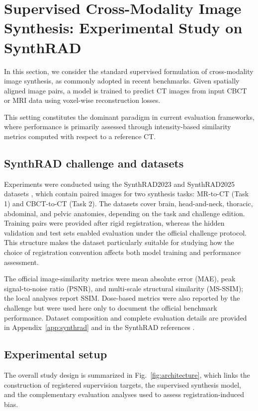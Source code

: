 \documentclass[lettersize,journal]{IEEEtran}
\begin{document}
\section{Supervised Cross-Modality Image Synthesis: Experimental Study on SynthRAD}

In this section, we consider the standard supervised formulation of cross-modality image synthesis, as commonly adopted in recent benchmarks. Given spatially aligned image pairs, a model is trained to predict CT images from input CBCT or MRI data using voxel-wise reconstruction losses.

This setting constitutes the dominant paradigm in current evaluation frameworks, where performance is primarily assessed through intensity-based similarity metrics computed with respect to a reference CT.

\subsection{SynthRAD challenge and datasets}

Experiments were conducted using the SynthRAD2023 and SynthRAD2025 datasets \cite{thummerer2025synthrad2025,huijben2024generating}, which contain paired images for two synthesis tasks: MR-to-CT (Task 1) and CBCT-to-CT (Task 2). The datasets cover brain, head-and-neck, thoracic, abdominal, and pelvic anatomies, depending on the task and challenge edition. Training pairs were provided after rigid registration, whereas the hidden validation and test sets enabled evaluation under the official challenge protocol. This structure makes the dataset particularly suitable for studying how the choice of registration convention affects both model training and performance assessment.

The official image-similarity metrics were mean absolute error (MAE), peak signal-to-noise ratio (PSNR), and multi-scale structural similarity (MS-SSIM); the local analyses report SSIM. Dose-based metrics were also reported by the challenge but were
used here only to document the official benchmark performance. Dataset composition and complete evaluation details are provided in Appendix~\ref{app:synthrad} and in the SynthRAD references \cite{thummerer2025synthrad2025,huijben2024generating}.

\subsection{Experimental setup}

The overall study design is summarized in Fig.~\ref{fig:architecture}, which links the construction of registered supervision targets, the supervised synthesis model, and the complementary evaluation analyses used to assess registration-induced bias.
\end{document}
